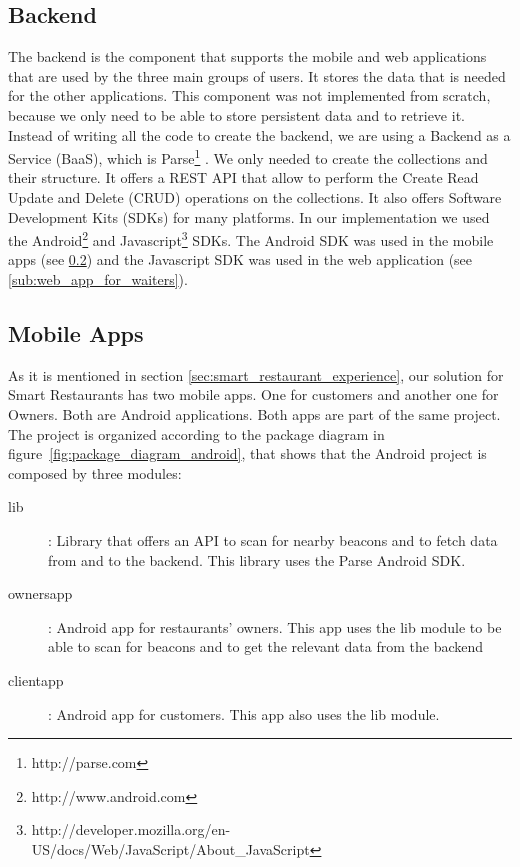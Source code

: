 \subsection{Backend}
\label{sub:backend}
The backend is the component that supports the mobile and web applications
that are used by the three main groups of users. It stores the data that is
needed for the other applications. This component was not implemented from
scratch, because we only need to be able to store persistent data and to
retrieve it. Instead of writing all the code to create the backend, we
are using a Backend as a Service (BaaS), which is Parse\footnote{http://parse.com}
\cite{parse}.
We only needed to create the collections and their structure.
It offers a REST API\cite{restful} that allow to perform the
Create Read Update and Delete (CRUD) operations
on the collections.
It also offers Software Development Kits (SDKs) for many platforms.
In our implementation we used the
Android\footnote{http://www.android.com} and
Javascript\footnote{http://developer.mozilla.org/en-US/docs/Web/JavaScript/About\_JavaScript}
SDKs. The Android SDK was used in the mobile apps (see \ref{sub:mobile_apps})
and the Javascript SDK was used in the web application
(see \ref{sub:web_app_for_waiters}).

\subsection{Mobile Apps}
\label{sub:mobile_apps}
As it is mentioned in section \ref{sec:smart_restaurant_experience}, our
solution for Smart Restaurants has two mobile apps. One for customers and
another one for Owners. Both are Android applications. Both apps are
part of the same project. The project is organized according to the
package diagram in figure~\ref{fig:package_diagram_android}, that shows
that the Android project is composed by three modules:
\begin{description}
  \item[lib]: Library that offers an API to scan for nearby beacons and
  to fetch data from and to the backend. This library uses the Parse Android
  SDK.
  \item[ownersapp]: Android app for restaurants' owners. This app uses
  the lib module to be able to scan for beacons and to get the relevant
  data from the backend
  \item[clientapp]: Android app for customers. This app also uses the lib
  module.
\end{description}

